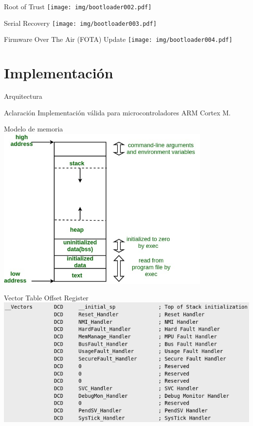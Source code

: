 \documentclass{beamer}
\begin{document}
\begin{frame}{Root of Trust}
    \centering
    \texttt{[image: img/bootloader002.pdf]}
\end{frame}

\begin{frame}{Serial Recovery}
    \centering
    \texttt{[image: img/bootloader003.pdf]}
\end{frame}

\begin{frame}{Firmware Over The Air (FOTA) Update}
    \centering
    \texttt{[image: img/bootloader004.pdf]}
\end{frame}

\section{Implementación}
\begin{frame}
    \sectionpage %
\end{frame}

\begin{frame}{Arquitectura}
    \begin{alertblock}{Aclaración}
        Implementación válida para microcontroladores ARM Cortex M.
    \end{alertblock}
\end{frame}

\begin{frame}{Modelo de memoria}
    \centering
    \includegraphics[width=0.8\textwidth]{img/memory.jpg}
\end{frame}

\begin{frame}{Vector Table Offset Register}
    \centering
    \includegraphics[width=1\textwidth]{img/vector_table.png}
\end{frame}
\end{document}
